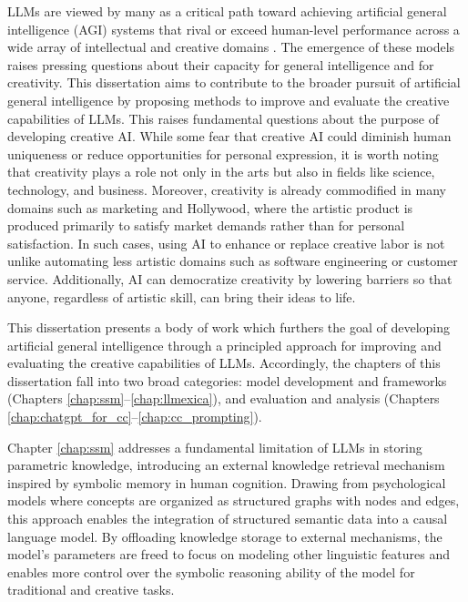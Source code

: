 \documentclass[phd,electronic,oneside,twosidetoc,letterpaper,chaptercenter,parttop,lof]{byumsphd}
\begin{document}
LLMs are viewed by many as a critical path toward achieving artificial general intelligence (AGI) systems that rival or exceed human-level performance across a wide array of intellectual and creative domains \cite{Morris2023PositionLO}. 
The emergence of these models raises pressing questions about their capacity for general intelligence and for creativity. 
This dissertation aims to contribute to the broader pursuit of artificial general intelligence by proposing methods to improve and evaluate the creative capabilities of LLMs. 
This raises fundamental questions about the purpose of developing creative AI. 
While some fear that creative AI could diminish human uniqueness or reduce opportunities for personal expression, it is worth noting that creativity plays a role not only in the arts but also in fields like science, technology, and business. 
Moreover, creativity is already commodified in many domains such as marketing and Hollywood, where the artistic product is produced primarily to satisfy market demands rather than for personal satisfaction. 
In such cases, using AI to enhance or replace creative labor is not unlike automating less artistic domains such as software engineering or customer service. 
Additionally, AI can democratize creativity by lowering barriers so that anyone, regardless of artistic skill, can bring their ideas to life.

This dissertation presents a body of work which furthers the goal of developing artificial general intelligence through a principled approach for improving and evaluating the creative capabilities of LLMs. 
Accordingly, the chapters of this dissertation fall into two broad categories: model development and frameworks (Chapters \ref{chap:ssm}–\ref{chap:llmexica}), and evaluation and analysis (Chapters \ref{chap:chatgpt_for_cc}–\ref{chap:cc_prompting}).

Chapter \ref{chap:ssm} addresses a fundamental limitation of LLMs in storing parametric knowledge, introducing an external knowledge retrieval mechanism inspired by symbolic memory in human cognition. 
Drawing from psychological models where concepts are organized as structured graphs with nodes and edges, this approach enables the integration of structured semantic data into a causal language model. 
By offloading knowledge storage to external mechanisms, the model's parameters are freed to focus on modeling other linguistic features and enables more control over the symbolic reasoning ability of the model for traditional and creative tasks. 
\end{document}
